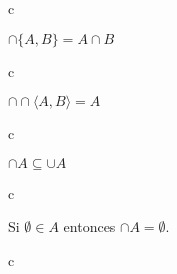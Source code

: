 \begin{dem}
	c
\end{dem}
\begin{problema}
	 $\cap\{A, B\}=A \cap B$
\end{problema}

\begin{dem}
	c
\end{dem}
\begin{problema}
	 $\cap \cap \langle A, B\rangle=A$
\end{problema}

\begin{dem}
	c
\end{dem}
\begin{problema}
	$\cap A \subseteq \cup A$
\end{problema}

\begin{dem}
	c
\end{dem}
\begin{problema}
	Si $\emptyset \in A$ entonces $\cap A=\emptyset$.
\end{problema}

\begin{dem}
	c
\end{dem}





